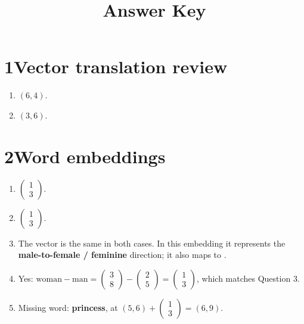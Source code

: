\documentclass[12pt]{ctexart}
\title{Answer Key}
\author{}
\date{}
\newcommand{\colvec}[2]{\begin{pmatrix} #1 \\ #2 \end{pmatrix}}
\begin{document}
\maketitle

\section*{1\quad Vector translation review}
\begin{enumerate}[label=\textbf{\arabic*.}]
\item \((6,4)\).
\item \((3,6)\).
\end{enumerate}

\section*{2\quad Word embeddings}
\begin{enumerate}[label=\textbf{\arabic*.}]
\item \(\colvec{1}{3}\).
\item \(\colvec{1}{3}\).
\item The vector is the same in both cases. In this embedding it represents the \textbf{male-to-female / feminine} direction; it also maps  to .
\item Yes: \(\text{woman}-\text{man}=\colvec{3}{8}-\colvec{2}{5}=\colvec{1}{3}\), which matches Question 3.
\item Missing word: \textbf{princess}, at \((5,6)+\colvec{1}{3}=(6,9)\).
\end{enumerate}
\end{document}
